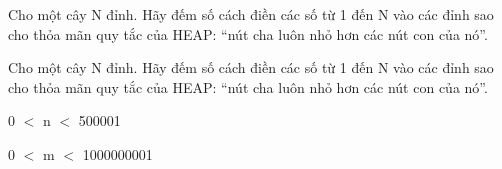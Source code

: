 Cho một cây N đỉnh. Hãy đếm số cách điền các số từ 1 đến N vào các đỉnh sao cho thỏa mãn quy tắc của HEAP: “nút cha luôn nhỏ hơn các nút con của nó”.

Cho một cây N đỉnh. Hãy đếm số cách điền các số từ 1 đến N vào các đỉnh sao cho thỏa mãn quy tắc của HEAP: “nút cha luôn nhỏ hơn các nút con của nó”.

0 $<$ n $<$ 500001

0 $<$ m $<$ 1000000001